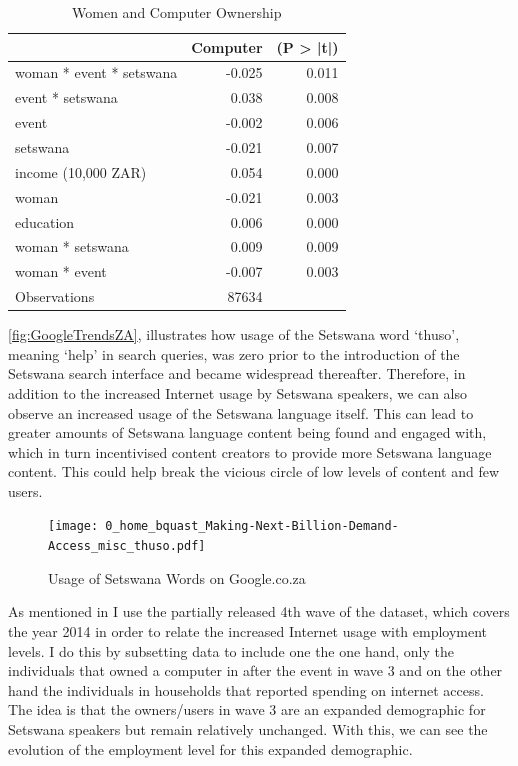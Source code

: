 \documentclass[a4paper,british]{article}\usepackage[]{graphicx}\usepackage[]{color}
\providecommand{\tabularnewline}{\\}
\let\ref\autoref
\begin{document}
\begin{table}[H]

\caption{Women and Computer Ownership}

\begin{centering}
\begin{tabular}{|l|r|r|}
\hline 
 &
Computer &
(P > |t|)\tabularnewline
\hline 
\hline 
woman {*} event {*} setswana &
-0.025 &
0.011\tabularnewline
\hline 
event {*} setswana &
0.038 &
0.008\tabularnewline
\hline 
event &
-0.002 &
0.006\tabularnewline
\hline 
setswana &
-0.021 &
0.007\tabularnewline
\hline 
income (10,000 ZAR) &
0.054 &
0.000\tabularnewline
\hline 
woman &
-0.021 &
0.003\tabularnewline
\hline 
education &
0.006 &
0.000\tabularnewline
\hline 
woman {*} setswana &
0.009 &
0.009\tabularnewline
\hline 
woman {*} event &
-0.007 &
0.003\tabularnewline
\hline 
Observations &
87634 &
\tabularnewline
\hline 
\end{tabular}
\par\end{centering}
\end{table}

\ref{fig:GoogleTrendsZA}, illustrates how usage of the Setswana word
`thuso', meaning `help' in search queries, was zero prior to the introduction
of the Setswana search interface and became widespread thereafter.
Therefore, in addition to the increased Internet usage by Setswana
speakers, we can also observe an increased usage of the Setswana language
itself. This can lead to greater amounts of Setswana language content
being found and engaged with, which in turn incentivised content creators
to provide more Setswana language content. This could help break the
vicious circle of low levels of content and few users.

\begin{figure}[H]
\caption{Usage of Setswana Words on Google.co.za}

\begin{centering}
\label{fig:GoogleTrendsZA}
\par\end{centering}
\begin{centering}
\par\end{centering}
\centering{}\texttt{[image: 0\_home\_bquast\_Making-Next-Billion-Demand-Access\_misc\_thuso.pdf]} 
\end{figure}

As mentioned in  I use the partially released 4th wave
of the dataset, which covers the year 2014 in order to relate the
increased Internet usage with employment levels. I do this by subsetting
data to include one the one hand, only the individuals that owned
a computer in after the event in wave 3 and on the other hand the
individuals in households that reported spending on internet access.
The idea is that the owners/users in wave 3 are an expanded demographic
for Setswana speakers but remain relatively unchanged. With this,
we can see the evolution of the employment level for this expanded
demographic.
\end{document}
